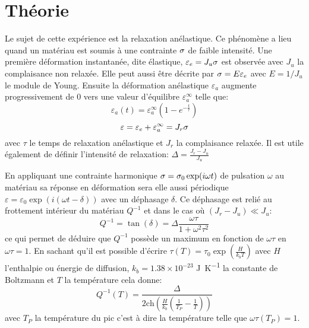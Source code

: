 \section{Théorie}

Le sujet de cette expérience est la relaxation anélastique. Ce phénomène a lieu quand un matériau est soumis à une contrainte $\sigma$ de faible intensité. Une première déformation instantanée, dite élastique, $\varepsilon_e = J_u \sigma$ est observée avec $J_u$ la complaisance non relaxée. Elle peut aussi être décrite par $\sigma = E\varepsilon_e$ avec $E = 1/J_u$ le module de Young. Ensuite la déformation anélastique $\varepsilon_a$ augmente progressivement de $0$ vers une valeur d'équilibre $\varepsilon_a^\infty$ telle que:
\begin{equation}
    \varepsilon_a(t) = \varepsilon_a^\infty \left(1-e^{-\frac{t}{\tau}}\right)
\end{equation}
\begin{equation}
    \varepsilon = \varepsilon_e + \varepsilon_a^\infty = J_r \sigma
\end{equation}
avec $\tau$ le temps de relaxation anélastique et $J_r$ la complaisance relaxée. Il est utile également de définir l'intensité de relaxation: $\Delta = \frac{J_r - J_u}{J_u}$

En appliquant une contrainte harmonique $\sigma = \sigma_0 \exp(i\omega t)$ de pulsation $\omega$ au matériau sa réponse en déformation sera elle aussi périodique $\varepsilon = \varepsilon_0\exp(i(\omega t - \delta))$ avec un déphasage $\delta$. Ce déphasage est relié au frottement intérieur du matériau $Q^{-1}$ et dans le cas où $(J_r - J_u) \ll J_u$:
\begin{equation}
    Q^{-1} = \tan(\delta) = \Delta\frac{\omega\tau}{1+\omega^2\tau^2}
\end{equation}
ce qui permet de déduire que $Q^{-1}$ possède un maximum en fonction de $\omega\tau$ en $\omega\tau = 1$. En sachant qu'il est possible d'écrire $\tau(T) = \tau_0 \exp(\frac{H}{k_bT})$ avec $H$ l'enthalpie ou énergie de diffusion, $k_b = 1.38 \times 10^{-23}$ \si{\joule \per \kelvin} la constante de Boltzmann et $T$ la température cela donne:
\begin{equation}
    Q^{-1}(T) = \frac{\Delta}{2 \mathrm{ch}\left(\frac{H}{k_b}\left(\frac{1}{T_P}-\frac{1}{T}\right)\right)}
    \label{eq:Q_inv_T}
\end{equation}
avec $T_P$ la température du pic c'est à dire la température telle que $\omega\tau(T_P) = 1$.

